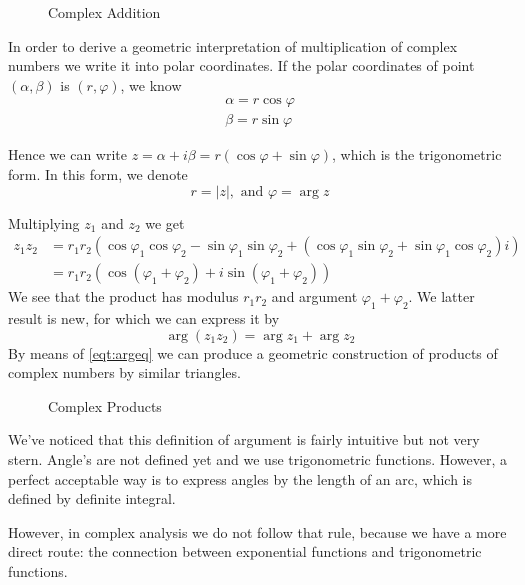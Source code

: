 \documentclass[../main.tex]{subfiles}
\begin{document}
\begin{figure}[H]
    \centering
    \caption{Complex Addition}
    \label{fig:complexaddition}
\end{figure}

In order to derive a geometric interpretation of multiplication of complex numbers we write it into polar coordinates. If the polar coordinates of point $\left(\alpha,\beta\right)$ is $\left(r,\varphi\right)$, we know
\begin{equation*}
\begin{aligned}
\alpha = r \cos \varphi\\
\beta = r \sin \varphi
\end{aligned}
\end{equation*}

Hence we can write $z=\alpha+i \beta = r \left(\cos \varphi+\sin \varphi\right)$, which is the trigonometric form. In this form, we denote
\begin{equation*}
r = \left|z\right|, \text{ and } \varphi = \arg z
\end{equation*}

Multiplying $z_1$ and $z_2$ we get
\begin{equation*}
\begin{aligned}
	z_1z_2 &= r_1r_2 \left(\cos \varphi_1 \cos \varphi_2 - \sin \varphi_1 \sin \varphi_2 + \left(\cos \varphi_1 \sin \varphi_2 + \sin \varphi_1 \cos \varphi_2\right)i\right)\\
 &= r_1r_2 \left(\cos \left(\varphi_1 + \varphi_2\right) + i\sin \left(\varphi_1+\varphi_2\right)\right)
\end{aligned}
\end{equation*}
We see that the product has modulus $r_1r_2$ and argument $\varphi_1 + \varphi_2$. We latter result is new, for which we can express it by
\begin{equation}\label{eqt:argeq}
\arg \left(z_1z_2\right) = \arg z_1+\arg z_2
\end{equation}
By means of \ref{eqt:argeq} we can produce a geometric construction of products of complex numbers by similar triangles.
\begin{figure}[H]
    \centering
    \caption{Complex Products}
    \label{fig:complex-products}
\end{figure}
\begin{remark}
We've noticed that this definition of argument is fairly intuitive but not very stern. Angle's are not defined yet and we use trigonometric functions. However, a perfect acceptable way is to express angles by the length of an arc, which is defined by definite integral.

However, in complex analysis we do not follow that rule, because we have a more direct route: the connection between exponential functions and trigonometric functions.
\end{remark}
\end{document}

